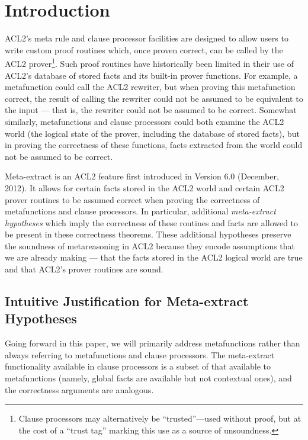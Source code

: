 

\section{Introduction}

ACL2's meta rule and clause processor facilities are designed to allow
users to write custom proof routines which, once proven
correct, can be called by the ACL2 prover\footnote{
  Clause processors may alternatively be ``trusted''---used without proof, but at the
  cost of a ``trust tag'' marking this use as a source of
  unsoundness.}.
Such proof routines have historically been limited in their use of
ACL2's database of stored facts and its built-in prover functions.
For example, a metafunction could call the ACL2 rewriter, but when
proving this metafunction correct, the result of calling the rewriter
could not be assumed to be equivalent to the input --- that is, the
rewriter could not be assumed to be correct.  Somewhat similarly,
metafunctions and clause processors could both examine the ACL2 world
(the logical state of the prover, including the database of stored
facts), but in proving the correctness of these functions, facts
extracted from the world could not be assumed to be correct.

Meta-extract is an ACL2 feature first introduced in Version 6.0
(December, 2012).  It allows for certain facts stored in the ACL2
world and certain ACL2 prover routines to be assumed
correct when proving the correctness of metafunctions and clause
processors.  In particular, additional \textit{meta-extract hypotheses}
which imply the correctness of these routines and facts are allowed to
be present in these correctness theorems. These additional hypotheses
preserve the soundness of metareasoning in ACL2 because they encode
assumptions that we are already
making --- that the facts stored in the ACL2 logical world are true
and that ACL2's prover routines are sound.

\subsection{Intuitive Justification for Meta-extract Hypotheses}

Going forward in this paper, we will primarily address metafunctions
rather than always referring to metafunctions and clause processors.
The meta-extract functionality available in clause processors is a
subset of that available to metafunctions (namely, global facts are
available but not contextual ones), and the correctness arguments are
analogous.

